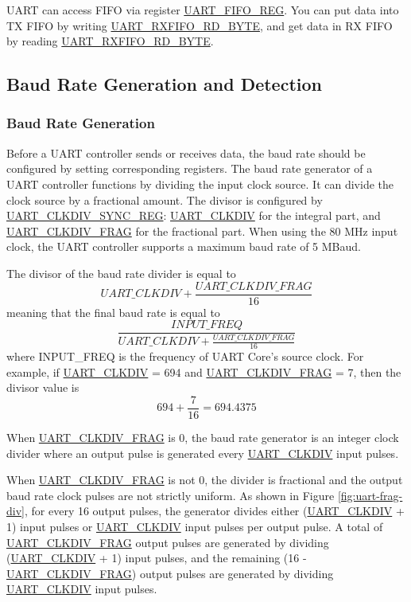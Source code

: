 \documentclass[main\_\_EN.tex]{subfiles}
\begin{document}
UART can access FIFO via register \hyperref[regdesc:UARTFIFOREG]{UART\_FIFO\_REG}. You can put data into TX FIFO by writing \hyperref[fielddesc:UARTRXFIFORDBYTE]{UART\_RXFIFO\_RD\_BYTE}, and get data in RX FIFO by reading \hyperref[fielddesc:UARTRXFIFORDBYTE]{UART\_RXFIFO\_RD\_BYTE}.

\subsection{Baud Rate Generation and Detection}

\subsubsection{Baud Rate Generation}

Before a UART controller sends or receives data, the baud rate should be configured by setting corresponding registers. The baud rate generator of a UART controller functions by dividing the input clock source. It can divide the clock source by a fractional amount. The divisor is configured by \hyperref[regdesc:UARTCLKDIVSYNCREG]{UART\_CLKDIV\_SYNC\_REG}: \hyperref[fielddesc:UARTCLKDIV]{UART\_CLKDIV} for the integral part, and \hyperref[fielddesc:UARTCLKDIVFRAG]{UART\_CLKDIV\_FRAG} for the fractional part. When using the 80 MHz input clock, the UART controller supports a maximum baud rate of 5 MBaud.

The divisor of the baud rate divider is equal to
\[
    \hyperref[fielddesc:UARTCLKDIV]{UART\_CLKDIV} + \frac{\hyperref[fielddesc:UARTCLKDIVFRAG]{UART\_CLKDIV\_FRAG}}{16}
\]
meaning that the final baud rate is equal to
\[
    \frac{INPUT\_FREQ}{\hyperref[fielddesc:UARTCLKDIV]{UART\_CLKDIV} + \frac{\hyperref[fielddesc:UARTCLKDIVFRAG]{UART\_CLKDIV\_FRAG}}{16}}
\]
where INPUT\_FREQ is the frequency of UART Core's source clock. For example, if \hyperref[fielddesc:UARTCLKDIV]{UART\_CLKDIV} = 694 and \hyperref[fielddesc:UARTCLKDIVFRAG]{UART\_CLKDIV\_FRAG} = 7,
then the divisor value is
\[
    694 + \frac{7}{16} = 694.4375
\]


When \hyperref[fielddesc:UARTCLKDIVFRAG]{UART\_CLKDIV\_FRAG} is 0, the baud rate generator is an integer clock divider where an output pulse is generated every
\hyperref[fielddesc:UARTCLKDIV]{UART\_CLKDIV} input pulses.

When \hyperref[fielddesc:UARTCLKDIVFRAG]{UART\_CLKDIV\_FRAG} is not 0, the divider is fractional and the output baud rate clock pulses are not strictly uniform.
As shown in Figure \ref{fig:uart-frag-div}, for every 16 output pulses, the generator divides either (\hyperref[fielddesc:UARTCLKDIV]{UART\_CLKDIV} + 1) input pulses or \hyperref[fielddesc:UARTCLKDIV]{UART\_CLKDIV} input pulses per
output pulse. A total of \hyperref[fielddesc:UARTCLKDIVFRAG]{UART\_CLKDIV\_FRAG} output pulses are generated by dividing (\hyperref[fielddesc:UARTCLKDIV]{UART\_CLKDIV} + 1) input pulses, and the remaining
(16 - \hyperref[fielddesc:UARTCLKDIVFRAG]{UART\_CLKDIV\_FRAG}) output pulses are generated by dividing \hyperref[fielddesc:UARTCLKDIV]{UART\_CLKDIV} input pulses.
\end{document}
